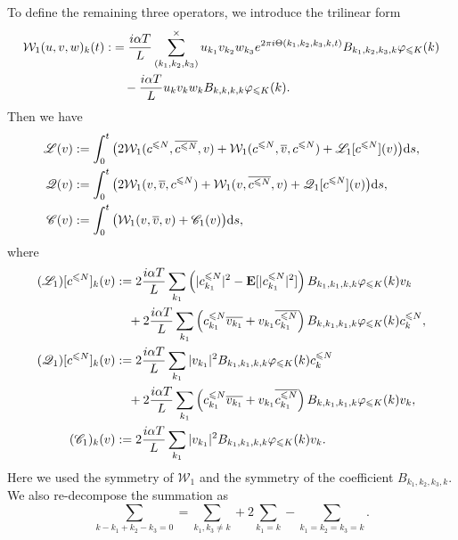\documentclass[UTF-8,reqno]{amsart}
\numberwithin{equation}{section}
\theoremstyle{definition}
\def\dif{{\mathord{{\rm d}}}}
\def\leq{\leqslant}
\def\dif{{\mathord{{\rm d}}}}
\def\leq{\leqslant}
\begin{document}
To define the remaining three operators, we introduce the trilinear form
\begin{align}
  \mathcal{W}_1(u,v,w)_k(t):&=\frac{i\alpha T}{L}\sum\limits_{(k_1,k_2, k_{3})}^{\times} u_{k_1}{v_{k_2}}  w_{k_3} e^{2\pi i \Theta(k_1,k_2,k_3,k,t)}B_{k_1,k_2,k_3,k}\varphi_{\leq K}(k)\notag\\
&\quad -\frac{i\alpha T}{L}u_{k}{v_{k}}w_{k}B_{k,k,k,k}\varphi_{\leq K}(k)\notag.    
\end{align}
Then we have
\begin{align}
\mathscr{L}(v)&:=\int_0^t \big(2\mathcal{W}_1(c^{\leq N}, \overline{c^{\leq N}}, v)+\mathcal{W}_1(c^{\leq N},\overline{ v}, c^{\leq N})+\mathscr{L}_1[c^{\leq N}](v)\big)\dif s, \notag \\
\mathscr{Q}(v)&:=\int_0^t \big(2\mathcal{W}_1(v,\overline{v}, c^{\leq N})+\mathcal{W}_1(v, \overline{c^{\leq N}}, v)+\mathscr{Q}_1[c^{\leq N}](v)\big)\dif s,\notag\\
\mathscr{C}(v)&:=\int_0^t  \big(\mathcal{W}_1(v, \overline{v}, v)+\mathscr{C}_1(v) \big)\dif s,\label{def:l}
\end{align} 
    where
\begin{align}
(\mathscr{L}_1)[c^{\leq N}]_k(v)&:=2\frac{i\alpha T}{L}\sum_{k_1}\left(|c^{\leq N}_{k_1}|^2 -\mathbf{E}[|c^{\leq N}_{k_1}|^2] \right) B_{k_1,k_1,k,k}\varphi_{\leq K}(k)v_k\notag\\
&\quad +2\frac{i\alpha T}{L}\sum_{k_1}\left(c_{k_1}^{\leq N}\overline{v_{k_1}}+v_{k_1}\overline{c_{k_1}^{\leq N}}\right) B_{k,k_1,k_1,k}\varphi_{\leq K}(k)c_k^{\leq N},\notag\\
(\mathscr{Q}_1)[c^{\leq N}]_k(v)&:=2\frac{i\alpha T}{L}\sum_{k_1}|v_{k_1}|^2 B_{k_1,k_1,k,k}\varphi_{\leq K}(k)c_k^{\leq N}\notag\\
    &\quad +2\frac{i\alpha T}{L}\sum_{k_1}\left(c_{k_1}^{\leq N}\overline{v_{k_1}}+v_{k_1}\overline{c_{k_1}^{\leq N}}\right) B_{k,k_1,k_1,k}\varphi_{\leq K}(k)v_k,\notag\\
(\mathscr{C}_1)_k(v)&:=2\frac{i\alpha T}{L}\sum_{k_1}|v_{k_1}|^2 B_{k_1,k_1,k,k}\varphi_{\leq K}(k)v_k.\notag
\end{align}
Here we used the symmetry of $\mathcal{W}_1$ and the symmetry of the coefficient $B_{k_1,k_2,k_3,k}$. We also re-decompose the summation as
 $$
\sum\limits_{ k - k_1 + k_2 -k_3 = 0}= \sum_{k_1, k_3\neq k}+2\sum_{k_1=k}-\sum_{k_1=k_2=k_3=k}.
$$
\end{document}
